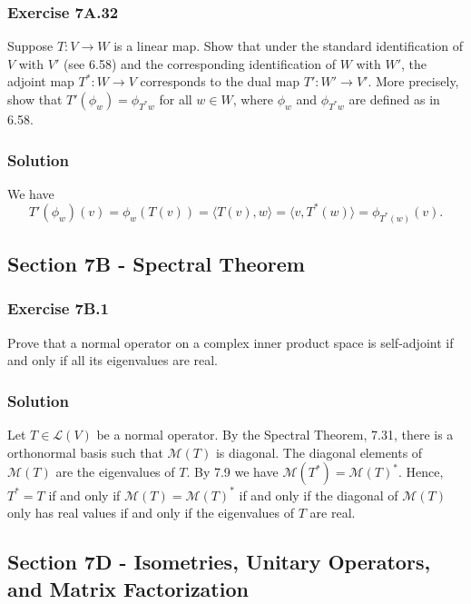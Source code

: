 \subsubsection*{Exercise 7A.32}

Suppose $T: V \to W$ is a linear map.
Show that under the standard identification of $V$ with $V'$ (see 6.58) and the corresponding identification of $W$ with $W'$, the adjoint map $T^*: W \to V$ corresponds to the dual map $T': W' \to V'$.
More precisely, show that $T'(\phi_w) = \phi_{T^*w}$ for all $w \in W$, where $\phi_w$ and $\phi_{T^*w}$ are defined as in 6.58.

\subsubsection*{Solution}

We have
\begin{equation*}
    T'(\phi_w)(v)
        = \phi_w(T(v))
        = \langle T(v), w \rangle
        = \langle v, T^*(w) \rangle
        = \phi_{T^*(w)}(v).
\end{equation*}


\subsection*{Section 7B - Spectral Theorem}

\subsubsection*{Exercise 7B.1}

Prove that a normal operator on a complex inner product space is self-adjoint if and only if all its eigenvalues are real.

\subsubsection*{Solution}

Let $T \in \mathcal{L}(V)$ be a normal operator.
By the Spectral Theorem, 7.31, there is a orthonormal basis such that $\mathcal{M}(T)$ is diagonal.
The diagonal elements of $\mathcal{M}(T)$ are the eigenvalues of $T$.
By 7.9 we have $\mathcal{M}(T^*) = \mathcal{M}(T)^*$.
Hence, $T^* = T$ if and only if $\mathcal{M}(T) = \mathcal{M}(T)^*$ if and only if the diagonal of $\mathcal{M}(T)$ only has real values if and only if the eigenvalues of $T$ are real.


\subsection*{Section 7D - Isometries, Unitary Operators, and Matrix Factorization}

